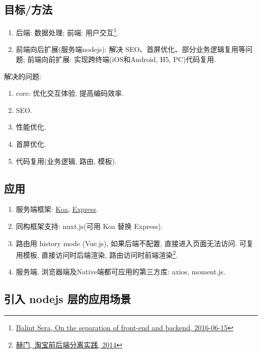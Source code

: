 \subsection{目标/方法}\label{ux76eeux6807ux65b9ux6cd5}

\begin{enumerate}
\def\labelenumi{\arabic{enumi}.}
\tightlist
\item
  后端: 数据处理; 前端: 用户交互\footnote{\href{https://medium.com/@balint_sera/on-the-separation-of-front-end-and-backend-7a0809b42820}{Balint
    Sera, On the separation of front-end and backend, 2016-06-15}}.
\item
  前端向后扩展(服务端nodejs): 解决
  SEO、首屏优化、部分业务逻辑复用等问题; 前端向前扩展:
  实现跨终端(iOS和Android, H5, PC)代码复用.
\end{enumerate}

解决的问题:

\begin{enumerate}
\def\labelenumi{\arabic{enumi}.}
\tightlist
\item
  core: 优化交互体验, 提高编码效率.
\item
  SEO.
\item
  性能优化.
\item
  首屏优化.
\item
  代码复用(业务逻辑, 路由, 模板).
\end{enumerate}

\subsection{应用}\label{ux5e94ux7528}

\begin{enumerate}
\def\labelenumi{\arabic{enumi}.}
\tightlist
\item
  服务端框架: \href{https://github.com/koajs/koa}{Koa},
  \href{https://github.com/expressjs/express}{Express}.
\item
  同构框架支持: nuxt.js(可用 Koa 替换 Express).
\item
  路由用 history mode (Vue.js), 如果后端不配置, 直接进入页面无法访问.
  可复用模板, 直接访问时后端渲染, 路由访问时前端渲染\footnote{\href{http://2014.jsconf.cn/slides/herman-taobaoweb/\#/}{赫门,
    淘宝前后端分离实践, 2014}}.
\item
  服务端, 浏览器端及Native端都可应用的第三方库: axios, moment.js.
\end{enumerate}

\subsection{引入 nodejs
层的应用场景}\label{ux5f15ux5165-nodejs-ux5c42ux7684ux5e94ux7528ux573aux666f}

